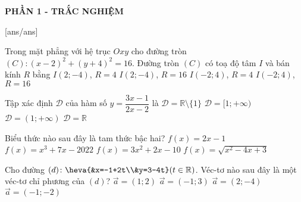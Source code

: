 
\begin{center}
	\textbf{PHẦN 1 - TRẮC NGHIỆM}
\end{center}
[ans/ans]
\begin{ex}%
	Trong mặt phẳng với hệ trục $Oxy$ cho đường tròn $(C)\colon (x-2)^2 +(y+ 4)^2=16$. Đường tròn $(C)$ có toạ độ tâm $I$ và bán kính $R$ bằng
	\choice
		{\True $I(2;-4)$, $R=4$}
		{$I(2;-4)$, $R=16$}
		{$I(-2;4)$, $R=4$}
		{$I(-2;4)$, $R=16$}
	\end{ex}
\begin{ex}%
	Tập xác định $\mathscr{D}$ của hàm số $y=\dfrac{3x-1}{2x-2}$ là
	\choice
	{\True $\mathscr{D}=\mathbb{R}\setminus\{1\}$}
	{$\mathscr{D}=[1;+\infty)$}
	{$\mathscr{D}=(1;+\infty)$}
	{$\mathscr{D}=\mathbb{R}$}
\end{ex}

\begin{ex}%
	Biểu thức nào sau đây là tam thức bậc hai?
	\choice
	{$f(x)=2x-1$}
	{$f(x)=x^3+7x-2022$}
	{\True $f(x)=3x^2+2x-10$}
	{$f(x)=\sqrt{x^2-4x+3}$}
\end{ex}

\begin{ex}%
	Cho đường $(d)\colon \heva{&x=-1+2t\\&y=3-4t} (t\in\mathbb{R})$. Véc-tơ nào sau đây là một véc-tơ chỉ phương của $(d)$?
	\choice
	{$\overrightarrow{a}=(1;2)$}
	{$\overrightarrow{a}=(-1;3)$}
	{\True $\overrightarrow{a}=(2;-4)$}
	{$\overrightarrow{a}=(-1;-2)$}
\end{ex}

